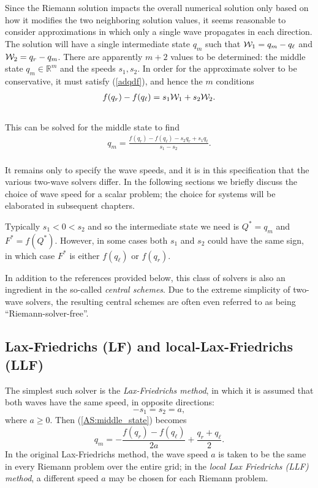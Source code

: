\documentclass{SIAMbook2016}
\begin{document}
Since the Riemann solution impacts the overall numerical solution only
based on how it modifies the two neighboring solution values, it seems
reasonable to consider approximations in which only a single wave
propagates in each direction. The solution will have a single
intermediate state \(q_m\) such that \({\cal W}_1 = q_m - q_\ell\) and
\({\cal W}_2 = q_r-q_m\). There are apparently \(m+2\) values to be
determined: the middle state \(q_m \in {\mathbb R}^m\) and the speeds
\(s_1, s_2\). In order for the approximate solver to be conservative, it
must satisfy (\ref{adqdf}), and hence the \(m\) conditions\\
\begin{align}
f(q_r) - f(q_\ell) = s_1 {\cal W}_1 + s_2 {\cal W}_2.
\end{align}\\
This can be solved for the middle state to find\\
\begin{align}  \label{AS:middle_state}
q_m = \frac{f(q_r) - f(q_\ell) - s_2 q_r + s_1 q_\ell}{s_1 - s_2}.
\end{align}\\
It remains only to specify the wave speeds, and it is in this
specification that the various two-wave solvers differ. In the following
sections we briefly discuss the choice of wave speed for a scalar
problem; the choice for systems will be elaborated in subsequent
chapters.

Typically \(s_1 < 0 < s_2\) and so the intermediate state we need is
\(Q^* = q_m\) and \(F^* = f(Q^*)\). However, in some cases both \(s_1\)
and \(s_2\) could have the same sign, in which case \(F^*\) is either
\(f(q_\ell)\) or \(f(q_r)\).

In addition to the references provided below, this class of solvers is
also an ingredient in the so-called \emph{central schemes}. Due to the
extreme simplicity of two-wave solvers, the resulting central schemes
are often even referred to as being ``Riemann-solver-free''.

\hypertarget{lax-friedrichs-lf-and-local-lax-friedrichs-llf}{%
\subsection{Lax-Friedrichs (LF) and local-Lax-Friedrichs
(LLF)}\label{lax-friedrichs-lf-and-local-lax-friedrichs-llf}}

The simplest such solver is the \emph{Lax-Friedrichs method}, in which
it is assumed that both waves have the same speed, in opposite
directions: \[-s_1 = s_2 = a,\] where \(a\ge 0\). Then
(\ref{AS:middle_state}) becomes
\[q_m = -\frac{f(q_r) - f(q_\ell)}{2a} + \frac{q_r + q_\ell}{2}.\] In
the original Lax-Friedrichs method, the wave speed \(a\) is taken to be
the same in every Riemann problem over the entire grid; in the
\emph{local Lax Friedrichs (LLF) method}, a different speed \(a\) may be
chosen for each Riemann problem.
\end{document}
